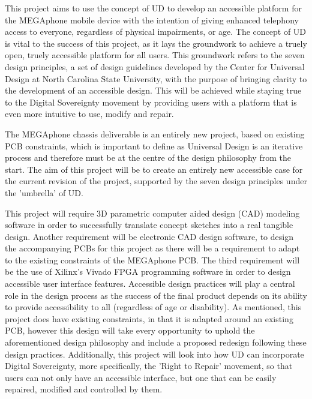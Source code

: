 This project aims to use the concept of UD to develop an accessible platform for the MEGAphone mobile device with the intention of giving enhanced telephony access to everyone, regardless of physical impairments, or age.
The concept of UD is vital to the success of this project, as it lays the groundwork to achieve a truely open, truely accessible platform for all users. 
This groundwork refers to the seven design principles, a set of design guidelines developed by the Center for Universal Design at North Carolina State University\cite{sevenprinciples}, with the purpose of bringing clarity to the development of an accessible design.
This will be achieved while staying true to the Digital Sovereignty movement by providing users with a platform that is even more intuitive to use, modify and repair.

The MEGAphone chassis deliverable is an entirely new project, based on existing PCB constraints, which is important to define as Universal Design is an iterative process and therefore must be at the centre of the design philosophy from the start\cite{incldesign}.
The aim of this project will be to create an entirely new accessible case for the current revision of the project, supported by the seven design principles under the 'umbrella' of UD.

This project will require 3D parametric computer aided design (CAD) modeling software in order to successfully translate concept sketches into a real tangible design.
Another requirement will be electronic CAD design software, to design the accompanying PCBs for this project as there will be a requirement to adapt to the existing constraints of the MEGAphone PCB.
The third requirement will be the use of Xilinx's Vivado FPGA programming software in order to design accessible user interface features.
Accessible design practices will play a central role in the design process as the success of the final product depends on its ability to provide accessibility to all (regardless of age or disability). 
As mentioned, this project does have existing constraints, in that it is adapted around an existing PCB, however this design will take every opportunity to uphold the aforementioned design philosophy and include a proposed redesign following these design practices.
Additionally, this project will look into how UD can incorporate Digital Sovereignty, more specifically, the 'Right to Repair' movement, so that users can not only have an accessible interface, but one that can be easily repaired, modified and controlled by them.

